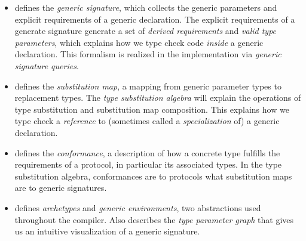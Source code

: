 \documentclass[../generics]{subfiles}
\begin{document}
\begin{itemize}
\item {} defines the \emph{generic signature}, which collects the generic parameters and explicit requirements of a generic declaration. The explicit requirements of a generate signature generate a set of \emph{derived requirements} and \emph{valid type parameters}, which explains how we type check code \emph{inside} a generic declaration. This formalism is realized in the implementation via \emph{generic signature queries}.

\item {} defines the \emph{substitution map}, a mapping from generic parameter types to replacement types. The \emph{type substitution algebra} will explain the operations of type substitution and substitution map composition. This explains how we type check a \emph{reference} to (sometimes called a \emph{specialization} of) a generic declaration.

\item {} defines the \emph{conformance}, a description of how a concrete type fulfills the requirements of a protocol, in particular its associated types. In the type substitution algebra, conformances are to protocols what substitution maps are to generic signatures.

\item {} defines \emph{archetypes} and \emph{generic environments}, two abstractions used throughout the compiler. Also describes the \emph{type parameter graph} that gives us an intuitive visualization of a generic signature.
\end{itemize}
\end{document}
